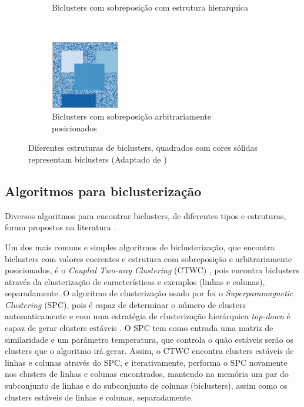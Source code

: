 \documentclass[normaltoc, espacoumemeio, pnumromarab,ruledheader]{abnt}
\begin{document}
\begin{figure}[h]
\begin{subfigure}[b]{0.3\textwidth}
            \caption{Biclusters com sobreposição com estrutura hierarquica}
            \label{fig:bicstruct-h}
    \end{subfigure}
    ~
    \centering
    \begin{subfigure}[b]{0.3\textwidth}
            \includegraphics[width=30mm]{img/i-bic-struct.png}
            \caption{Biclusters com sobreposição arbitrariamente posicionados}
            \label{fig:bicstruct-i}
    \end{subfigure}
    \caption{Diferentes estruturas de biclusters, quadrados com cores sólidas representam biclusters (Adaptado de \cite{Madeira2004})}
    \label{fig:bicstruct}
\end{figure}

\subsection{Algoritmos para biclusterização}

Diversos algoritmos para encontrar biclusters, de diferentes tipos e estruturas, foram propostos na literatura \cite{Tanay2005,Madeira2004}.

Um dos mais comuns e simples algoritmos de biclusterização, que encontra biclusters com valores coerentes e estrutura com sobreposição e arbitrariamente posicionados, é o \textit{Coupled Two-way Clustering} (CTWC) \cite{Getz2000}, pois encontra biclusters através da clusterização de características e exemplos (linhas e colunas), separadamente.
O algoritmo de clusterização usado por \cite{Getz2000} foi o \textit{Superparamagnetic Clustering} (SPC), pois é capaz de determinar o número de clusters automaticamente e com uma estratégia de clusterização hierárquica \textit{top-down} é capaz de gerar clusters estáveis \cite{Getz2000}.
O SPC tem como entrada uma matriz de similaridade e um parâmetro temperatura, que controla o quão estáveis serão os clusters que o algoritmo irá gerar.
Assim, o CTWC encontra clusters estáveis de linhas e colunas através do SPC, e iterativamente, performa o SPC novamente nos clusters de linhas e colunas encontrados, mantendo na memória um par do subconjunto de linhas e do subconjunto de colunas (biclusters), assim como os clusters estáveis de linhas e colunas, separadamente.
\end{document}
